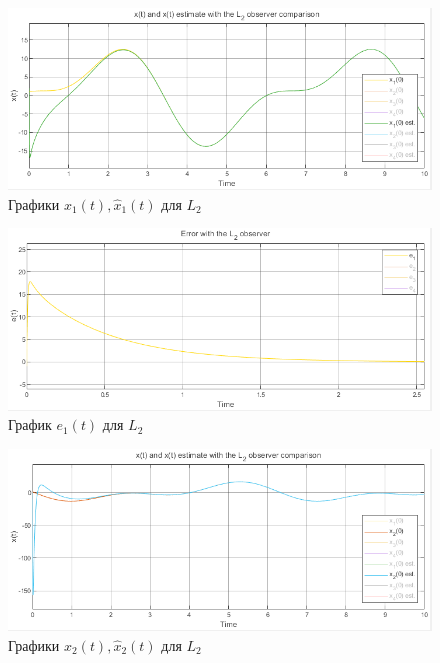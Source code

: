\documentclass[a4paper, 12pt]{article}
\begin{document}
    \newpage
    \vspace*{5mm}
    \begin{figure}[H]
        \centering
        \includegraphics[scale=0.7]{2task_x1comp_L2.png}
        \captionsetup{skip=0pt}
        \caption{Графики $x_1(t),\hat{x}_1(t)$ для $L_2$}
        \label{fig:2task_x1comp_L2}
    \end{figure}
    \begin{figure}[H]
        \centering
        \includegraphics[scale=0.7]{2task_e1_L2.png}
        \captionsetup{skip=0pt}
        \caption{График $e_1(t)$ для $L_2$}
        \label{fig:2task_e1_L2}
    \end{figure}
    \begin{figure}[H]
        \centering
        \includegraphics[scale=0.7]{2task_x2comp_L2.png}
        \captionsetup{skip=0pt}
        \caption{Графики $x_2(t),\hat{x}_2(t)$ для $L_2$}
        \label{fig:2task_x2comp_L2}
    \end{figure}
\end{document}
